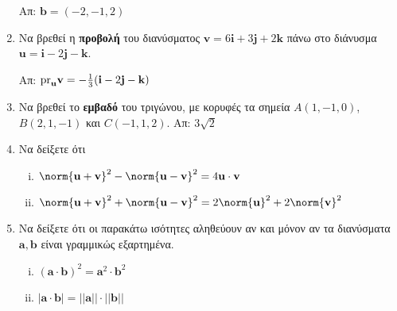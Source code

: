 \documentclass[a4paper,table]{report}
\renewcommand{\vec}{\mathbf}
\begin{document}
\begin{enumerate}[itemsep=0.7\baselineskip]
    \hfill Απ: $ \vec{b}=(-2,-1,2) $

  \item Να βρεθεί η \textbf{προβολή} του διανύσματος 
    $ \mathbf{v} = 6 \mathbf{i}+3 \mathbf{j} + 2 \mathbf{k} $ πάνω στο διάνυσμα 
    $ \mathbf{u} = \mathbf{i}-2 \mathbf{j} - \mathbf{k} $.

    \hfill Απ: $ \rm{pr}_{\mathbf{u}}{\mathbf{v}} = -\frac{1}{3} (\mathbf{i}-2
    \mathbf{j}- \mathbf{k}) $ 

  \item Να βρεθεί το \textbf{εμβαδό} του τριγώνου, με κορυφές τα σημεία $ A(1,-1,0) $, 
    $ B(2,1,-1) $ και $ C(-1,1,2) $. 
    \hfill Απ: $ 3 \sqrt{2} $ 


  \item Να δείξετε ότι 
    \begin{enumerate}[(i)]
      \item $ \norm{\mathbf{u}+ \mathbf{v}}^{2} - \norm{\mathbf{u}- \mathbf{v}}^{2} 
        = 4 \mathbf{u}\cdot \mathbf{v} $
      \item $ \norm{\mathbf{u}+ \mathbf{v}}^{2} + \norm{\mathbf{u}- \mathbf{v}}^{2} 
        = 2 \norm{\mathbf{u}} ^{2} + 2 \norm{\mathbf{v}} ^{2} $
    \end{enumerate}

  \item Να δείξετε ότι οι παρακάτω ισότητες αληθεύουν αν και μόνον αν 
    τα διανύσματα $ \mathbf{a}, \mathbf{b} $ είναι γραμμικώς εξαρτημένα.
    \begin{enumerate}[(i)]
      \item $(\vec{a}\cdot \vec{b})^{2} = \vec{a}^{2}\cdot \vec{b}^{2}$
      \item $|\vec{a}\cdot \vec{b}| = ||\vec{a}|| \cdot ||\vec{b}||$
    \end{enumerate}


\end{enumerate}
\end{document}
